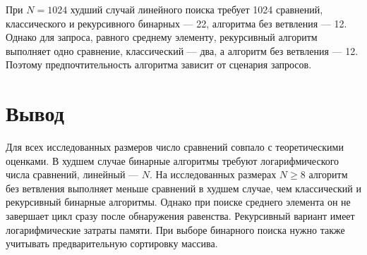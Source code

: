 При $N=1024$ худший случай линейного поиска требует 1024 сравнений, классического и рекурсивного бинарных --- 22, алгоритма без ветвления --- 12. Однако для запроса, равного среднему элементу, рекурсивный алгоритм выполняет одно сравнение, классический --- два, а алгоритм без ветвления --- 12. Поэтому предпочтительность алгоритма зависит от сценария запросов.

\section*{Вывод}
Для всех исследованных размеров число сравнений совпало с теоретическими оценками. В худшем случае бинарные алгоритмы требуют логарифмического числа сравнений, линейный --- $N$. На исследованных размерах $N\geq8$ алгоритм без ветвления выполняет меньше сравнений в худшем случае, чем классический и рекурсивный бинарные алгоритмы. Однако при поиске среднего элемента он не завершает цикл сразу после обнаружения равенства. Рекурсивный вариант имеет логарифмические затраты памяти. При выборе бинарного поиска нужно также учитывать предварительную сортировку массива.
